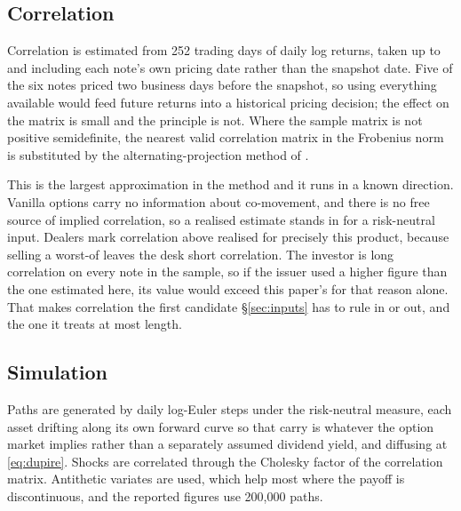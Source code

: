 \subsection{Correlation}

Correlation is estimated from 252 trading days of daily log returns, taken up to
and including each note's own pricing date rather than the snapshot date. Five
of the six notes priced two business days before the snapshot, so using
everything available would feed future returns into a historical pricing
decision; the effect on the matrix is small and the principle is not. Where the
sample matrix is not positive semidefinite, the nearest valid correlation matrix
in the Frobenius norm is substituted by the alternating-projection method of
\citet{Higham2002}.

This is the largest approximation in the method and it runs in a known
direction. Vanilla options carry no information about co-movement, and there is
no free source of implied correlation, so a realised estimate stands in for a
risk-neutral input. Dealers mark correlation above realised for precisely this
product, because selling a worst-of leaves the desk short correlation. The
investor is long correlation on every note in the sample, so if the issuer used
a higher figure than the one estimated here, its value would exceed this
paper's for that reason alone. That makes correlation the first candidate
\S\ref{sec:inputs} has to rule in or out, and the one it treats at most length.

\subsection{Simulation}

Paths are generated by daily log-Euler steps under the risk-neutral measure,
each asset drifting along its own forward curve so that carry is whatever the
option market implies rather than a separately assumed dividend yield, and
diffusing at \eqref{eq:dupire}. Shocks are correlated through the Cholesky
factor of the correlation matrix. Antithetic variates are used, which help most
where the payoff is discontinuous, and the reported figures use 200{,}000 paths.

